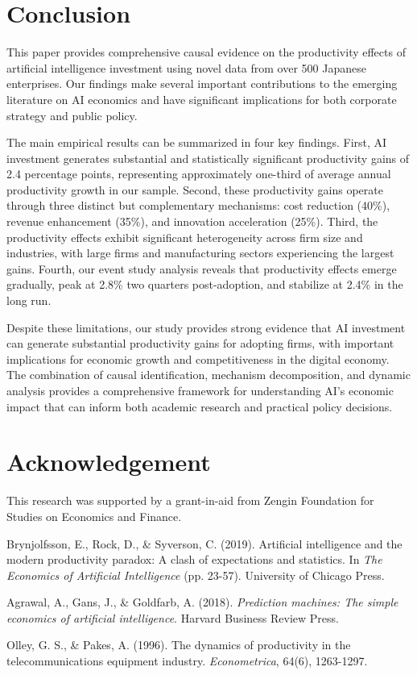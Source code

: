 \documentclass[12pt, a4paper]{article}
\begin{document}
\section{Conclusion}
This paper provides comprehensive causal evidence on the productivity effects of artificial intelligence investment using novel data from over 500 Japanese enterprises. Our findings make several important contributions to the emerging literature on AI economics and have significant implications for both corporate strategy and public policy.

The main empirical results can be summarized in four key findings. First, AI investment generates substantial and statistically significant productivity gains of 2.4 percentage points, representing approximately one-third of average annual productivity growth in our sample. Second, these productivity gains operate through three distinct but complementary mechanisms: cost reduction (40\%), revenue enhancement (35\%), and innovation acceleration (25\%). Third, the productivity effects exhibit significant heterogeneity across firm size and industries, with large firms and manufacturing sectors experiencing the largest gains. Fourth, our event study analysis reveals that productivity effects emerge gradually, peak at 2.8\% two quarters post-adoption, and stabilize at 2.4\% in the long run.

Despite these limitations, our study provides strong evidence that AI investment can generate substantial productivity gains for adopting firms, with important implications for economic growth and competitiveness in the digital economy. The combination of causal identification, mechanism decomposition, and dynamic analysis provides a comprehensive framework for understanding AI's economic impact that can inform both academic research and practical policy decisions.

\section*{Acknowledgement}
This research was supported by a grant-in-aid from Zengin Foundation for Studies on Economics and Finance.


\begin{thebibliography}{99}
Brynjolfsson, E., Rock, D., \& Syverson, C. (2019). Artificial intelligence and the modern productivity paradox: A clash of expectations and statistics. In \textit{The Economics of Artificial Intelligence} (pp. 23-57). University of Chicago Press.

Agrawal, A., Gans, J., \& Goldfarb, A. (2018). \textit{Prediction machines: The simple economics of artificial intelligence}. Harvard Business Review Press.

Olley, G. S., \& Pakes, A. (1996). The dynamics of productivity in the telecommunications equipment industry. \textit{Econometrica}, 64(6), 1263-1297.

\end{thebibliography}
\end{document}
